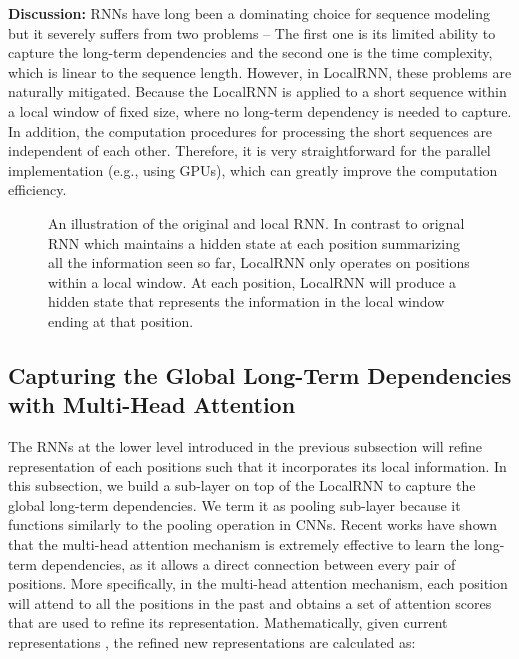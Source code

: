 \documentclass{article} \usepackage{iclr2019_conference,times}
\begin{document}
{\bf Discussion:} RNNs have long been a dominating choice for sequence modeling but it severely suffers from two problems -- The first one is its limited ability to capture the long-term dependencies and the second one is the time complexity, which is linear to the sequence length. However, in LocalRNN, these problems are naturally mitigated. Because the LocalRNN is applied to a short sequence within a local window of fixed size, where no long-term dependency is needed to capture. In addition, the computation procedures for processing the short sequences are independent of each other. Therefore, it is very straightforward for the parallel implementation (e.g., using GPUs), which can greatly improve the computation efficiency. 
\begin{figure}

	\begin{center}
	\end{center}
	\caption{An illustration of the original and local RNN. In contrast to orignal RNN which maintains a hidden state at each position summarizing all the information seen so far,  LocalRNN only operates on positions within a local window. At each position, LocalRNN will produce a hidden state that represents the information in the local window ending at that position.}
	\label{fig:rnn}
\end{figure}

\subsection{Capturing the Global Long-Term Dependencies with Multi-Head Attention}

The RNNs at the lower level introduced in the previous subsection will refine representation of each positions such that it incorporates its local information. In this subsection, we build a sub-layer on top of the LocalRNN to capture the global long-term dependencies. We term it as pooling sub-layer because it functions similarly to the pooling operation in CNNs. Recent works have shown that the multi-head attention mechanism is extremely effective to learn the long-term dependencies, as it allows a direct connection between every pair of positions. More specifically, in the multi-head attention mechanism, each position will attend to all the positions in the past and obtains a set of attention scores that are used to refine its representation. Mathematically, given current representations , the refined new representations  are calculated as:
 
\end{document}
